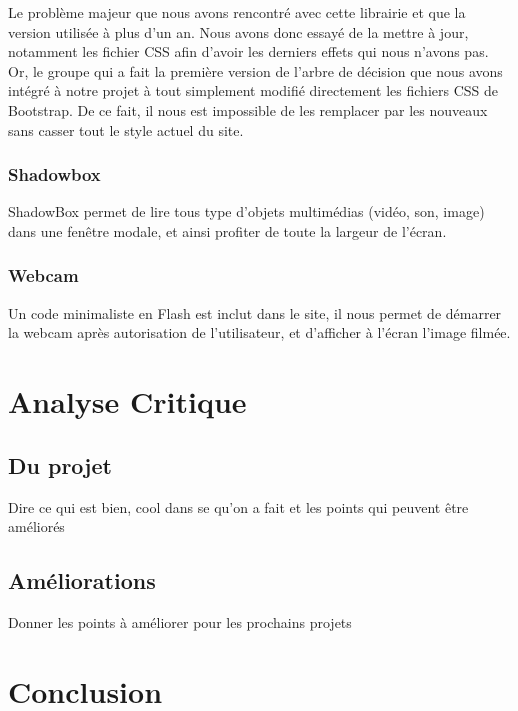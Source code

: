 \documentclass[twoside]{EPURapport}
\begin{document}
		Le problème majeur que nous avons rencontré avec cette librairie et que la version utilisée à plus d'un an. Nous avons donc essayé de la mettre à jour, notamment les fichier CSS afin d'avoir les derniers effets qui nous n'avons pas. Or, le groupe qui a fait la première version de l'arbre de décision que nous avons intégré à notre projet à tout simplement modifié directement les fichiers CSS de Bootstrap. De ce fait, il nous est impossible de les remplacer par les nouveaux sans casser tout le style actuel du site.
		
		\subsection{Shadowbox}
		\label{lib:shadowbox}
		ShadowBox permet de lire tous type d'objets multimédias (vidéo, son, image) dans une fenêtre modale, et ainsi profiter de toute la largeur de l'écran.
		
		\subsection{Webcam}
		\label{lib:webcam}
		Un code minimaliste en Flash est inclut dans le site, il nous permet de démarrer la webcam après autorisation de l'utilisateur, et d'afficher à l'écran l'image filmée.

\chapter{Analyse Critique}

	\section{Du projet}
	
	Dire ce qui est bien, cool dans se qu'on a fait et les points qui peuvent être améliorés
	
	\section{Améliorations}
	
	Donner les points à améliorer pour les prochains projets

\chapter{Conclusion}

\annexes
\end{document}
